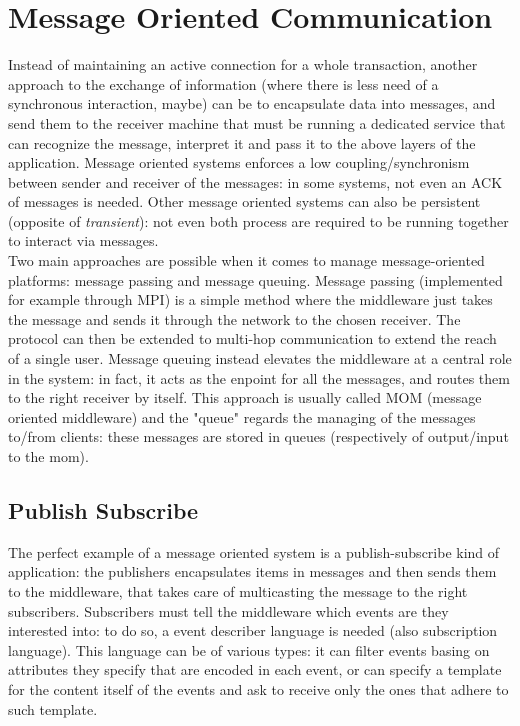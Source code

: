 \documentclass[10pt,a4paper]{article}
\begin{document}
		\section{Message Oriented Communication}
			Instead of maintaining an active connection for a whole transaction, another approach to the exchange of information (where there is less need of a synchronous interaction, maybe) can be to encapsulate data into messages, and send them to the receiver machine that must be running a dedicated service that can recognize the message, interpret it and pass it to the above layers of the application. Message oriented systems enforces a low coupling/synchronism between sender and receiver of the messages: in some systems, not even an ACK of messages is needed. Other message oriented systems can also be persistent (opposite of \emph{transient}): not even both process are required to be running together to interact via messages.\\
			Two main approaches are possible when it comes to manage message-oriented platforms: message passing and message queuing. Message passing (implemented for example through MPI) is a simple method where the middleware just takes the message and sends it through the network to the chosen receiver. The protocol can then be extended to multi-hop communication to extend the reach of a single user. Message queuing instead elevates the middleware at a central role in the system: in fact, it acts as the enpoint for all the messages, and routes them to the right receiver by itself. This approach is usually called MOM (message oriented middleware) and the "queue" regards the managing of the messages to/from clients: these messages are stored in queues (respectively of output/input to the mom).\\
			
			\subsection{Publish Subscribe}
				The perfect example of a message oriented system is a publish-subscribe kind of application: the publishers encapsulates items in messages and then sends them to the middleware, that takes care of multicasting the message to the right subscribers. Subscribers must tell the middleware which events are they interested into: to do so, a event describer language is needed (also subscription language). This language can be of various types: it can filter events basing on attributes they specify that are encoded in each event, or can specify a template for the content itself of the events and ask to receive only the ones that adhere to such template.
				
\end{document}
